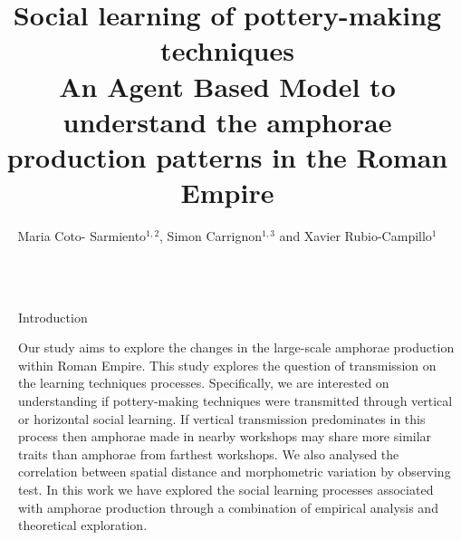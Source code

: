 \documentclass[final]{beamer}
\title{Social learning of pottery-making techniques\\{\huge An Agent Based Model to understand the amphorae production patterns in the Roman Empire}}
\author{Maria Coto- Sarmiento$^{1,2}$, Simon Carrignon$^{1,3}$ and Xavier Rubio-Campillo$^{1}$} %
\institute{$^1$Barcelona Supercomputing Center -- $^2$University of Barcelona -- $^3$Universitat Pompeu Fabra} %
\newlength{\sepwid}
\newlength{\onecolwid}
\begin{document}

\setlength{\belowcaptionskip}{2ex} %
\setlength\belowdisplayshortskip{2ex} %

\begin{frame}[t] %

\vspace{-1cm}

\begin{columns}[t] %

\begin{column}{\sepwid}\end{column} %

\begin{column}{\onecolwid} %


\begin{block}{Introduction}

\justify

Our study aims to explore the changes in the large-scale amphorae production within Roman Empire. This study explores the question of transmission on the learning techniques processes. Specifically, we are interested on understanding if pottery-making techniques were transmitted through vertical or horizontal social learning. If vertical transmission predominates in this process then amphorae made in nearby workshops may share more similar traits than amphorae from farthest workshops. We also analysed the correlation between spatial distance and morphometric variation by observing test. In this work we have explored the social learning processes associated with amphorae production through a combination of empirical analysis and theoretical exploration.   



\end{block}
\end{column}
\end{columns}
\end{frame}
\end{document}
